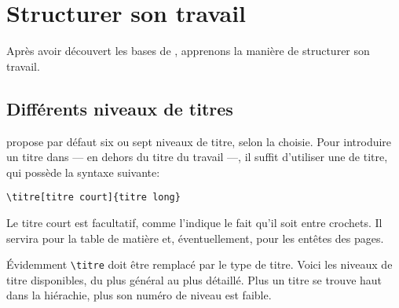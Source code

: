 \chapter{Structurer son travail}
\begin{prealable}
Après avoir découvert les bases de \logiciel{\LaTeX}, apprenons la manière de structurer son travail.
\end{prealable}

\section{Différents niveaux de titres}

\logiciel{\LaTex} propose par défaut six ou sept niveaux de titre, selon la  choisie.
Pour introduire un titre dans \logiciel{\LaTex} --- en dehors du titre du travail ---, il suffit d'utiliser une  de titre, qui possède la syntaxe suivante:
\begin{verbatim}
\titre[titre court]{titre long}
\end{verbatim}

Le titre court est facultatif, comme l'indique le fait qu'il soit entre crochets. Il servira pour la table de matière et, éventuellement, pour les entêtes des pages.

Évidemment \verb|\titre| doit être remplacé par le type de titre. Voici les niveaux de titre disponibles, du plus général au plus détaillé. Plus un titre se trouve haut dans la hiérachie, plus son numéro de niveau est faible.

